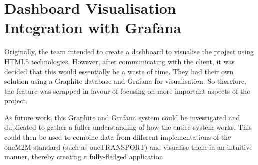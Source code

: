 \section{Dashboard Visualisation Integration with Grafana}

Originally, the team intended to create a dashboard to visualise the project using HTML5 technologies. However, after communicating with the client, it was decided that this would essentially be a waste of time. They had their own solution using a Graphite database and Grafana for visualisation. So therefore, the feature was scrapped in favour of focusing on more important aspects of the project.

As future work, this Graphite and Grafana system could be investigated and duplicated to gather a fuller understanding of how the entire system works. This could then be used to combine data from different implementations of the oneM2M standard (such as oneTRANSPORT) and visualise them in an intuitive manner, thereby creating a fully-fledged application.

\clearpage
